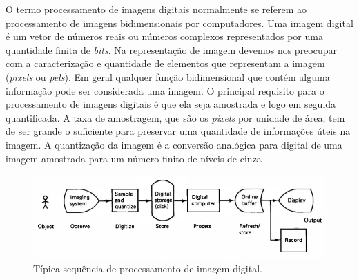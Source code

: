O termo processamento de imagens digitais normalmente se referem ao processamento de imagens bidimensionais por computadores. Uma imagem digital é um vetor de números reais ou números complexos representados por uma quantidade finita de \textit{bits}.
Na representação de imagem devemos nos preocupar com a caracterização e quantidade de elementos que representam a imagem (\textit{pixels} ou \textit{pels}). Em geral qualquer função bidimensional que contém alguma informação pode ser considerada uma imagem. O principal requisito para o processamento de imagens digitais é que ela seja amostrada e logo em seguida quantificada. A taxa de amostragem, que são os \textit{pixels} por unidade de área, tem de ser grande o suficiente para preservar uma quantidade de informações úteis na imagem. A quantização da imagem é a conversão analógica para digital de uma imagem amostrada para um número finito de níveis de cinza \cite{jain1989fundamentals}.
 \begin{figure}[h]
	\caption{\label{fig:digitalproc}Típica sequência de processamento de imagem digital.}
	\begin{center}
	    \includegraphics[width=.9\textwidth]{resources/digitalproc}
	\end{center}
\end{figure}





